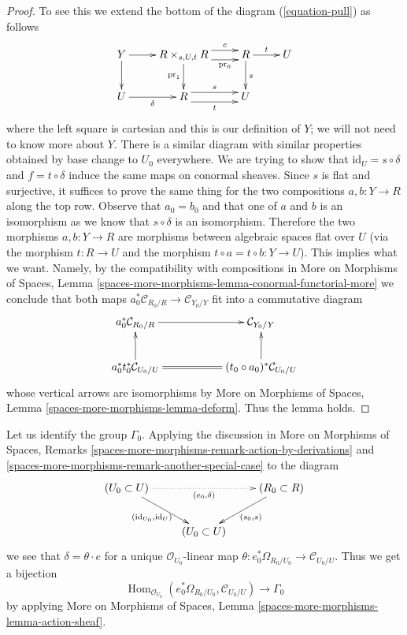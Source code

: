 \documentclass{stacks-project}
\theoremstyle{plain}
\theoremstyle{definition}
\theoremstyle{remark}
\numberwithin{equation}{subsection}
\def\Hom{\mathop{\mathrm{Hom}}\nolimits}
\begin{document}
\begin{proof}
To see this we extend the bottom of the diagram (\ref{equation-pull})
as follows
$$
\xymatrix{
Y \ar[r] \ar[d] &
R \times_{s, U, t} R
\ar@<1ex>[r]^-c \ar@<-1ex>[r]_-{\text{pr}_0} \ar[d]_{\text{pr}_1} &
R \ar[r]^t \ar[d]^s &
U \\
U \ar[r]_\delta &
R \ar@<1ex>[r]^s \ar@<-1ex>[r]_t &
U
}
$$
where the left square is cartesian and this is our definition
of $Y$; we will not need to know more about $Y$.
There is a similar diagram with similar properties obtained by
base change to $U_0$ everywhere.
We are trying to show that $\text{id}_U = s \circ \delta$
and $f = t \circ \delta$ induce the same maps on conormal sheaves.
Since $s$ is flat and surjective, it suffices to prove the same
thing for the two compositions $a, b : Y \to R$ along the top row.
Observe that $a_0 = b_0$ and that one of $a$ and $b$ is an isomorphism
as we know that $s \circ \delta$ is an isomorphism. Therefore
the two morphisms $a, b : Y \to R$ are morphisms between
algebraic spaces flat over $U$ (via the morphism $t : R \to U$
and the morphism $t \circ a = t \circ b : Y \to U$).
This implies what we want. Namely, by the compatibility with compositions in
More on Morphisms of Spaces, Lemma
\ref{spaces-more-morphisms-lemma-conormal-functorial-more}
we conclude that both maps
$a_0^*\mathcal{C}_{R_0/R} \to \mathcal{C}_{Y_0/Y}$
fit into a commutative diagram
$$
\xymatrix{
a_0^*\mathcal{C}_{R_0/R} \ar[rr] & & \mathcal{C}_{Y_0/Y} \\
a_0^*t_0^*\mathcal{C}_{U_0/U} \ar[u] \ar@{=}[rr] & &
(t_0 \circ a_0)^*\mathcal{C}_{U_0/U} \ar[u]
}
$$
whose vertical arrows are isomorphisms by
More on Morphisms of Spaces, Lemma
\ref{spaces-more-morphisms-lemma-deform}.
Thus the lemma holds.
\end{proof}

\noindent
Let us identify the group $\Gamma_0$.
Applying the discussion in More on Morphisms of Spaces, Remarks
\ref{spaces-more-morphisms-remark-action-by-derivations} and
\ref{spaces-more-morphisms-remark-another-special-case}
to the diagram
$$
\xymatrix{
(U_0 \subset U) \ar@{..>}[rr]_{(e_0, \delta)}
\ar[rd]_{(\text{id}_{U_0}, \text{id}_U)} & &
(R_0 \subset R) \ar[ld]^{(s_0, s)} \\
& (U_0 \subset U)
}
$$
we see that $\delta = \theta \cdot e$ for a unique
$\mathcal{O}_{U_0}$-linear map
$\theta : e_0^*\Omega_{R_0/U_0} \to \mathcal{C}_{U_0/U}$.
Thus we get a bijection
\begin{equation}
\label{equation-isomorphism}
\Hom_{\mathcal{O}_{U_0}}(e_0^*\Omega_{R_0/U_0}, \mathcal{C}_{U_0/U})
\longrightarrow
\Gamma_0
\end{equation}
by applying More on Morphisms of Spaces, Lemma
\ref{spaces-more-morphisms-lemma-action-sheaf}.
\end{document}
